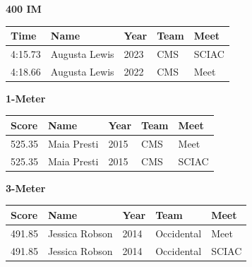 \vspace{1.2em}
\noindent\begin{minipage}[t]{0.98\textwidth}
\centering
\textbf{\textcolor{teamprimary}{400 IM}}\par
\vspace{0.5em}
\centering
\small
\renewcommand{\arraystretch}{1.0}
\setlength{\tabcolsep}{4pt}
\begin{tabular}{@{}p{2.5cm}p{4.5cm}p{1.5cm}p{2.5cm}p{2.5cm}@{}}
\toprule
\textbf{Time} & \textbf{Name} & \textbf{Year} & \textbf{Team} & \textbf{Meet} \\
\midrule
4:15.73 & Augusta Lewis & 2023 & CMS & SCIAC \\
4:18.66 & Augusta Lewis & 2022 & CMS & Meet \\
\bottomrule
\end{tabular}
\end{minipage}
\vspace{1.2em}
\noindent\begin{minipage}[t]{0.98\textwidth}
\centering
\textbf{\textcolor{teamprimary}{1-Meter}}\par
\vspace{0.5em}
\centering
\small
\renewcommand{\arraystretch}{1.0}
\setlength{\tabcolsep}{4pt}
\begin{tabular}{@{}p{2.5cm}p{4.5cm}p{1.5cm}p{2.5cm}p{2.5cm}@{}}
\toprule
\textbf{Score} & \textbf{Name} & \textbf{Year} & \textbf{Team} & \textbf{Meet} \\
\midrule
525.35 & Maia Presti & 2015 & CMS & Meet \\
525.35 & Maia Presti & 2015 & CMS & SCIAC \\
\bottomrule
\end{tabular}
\end{minipage}
\vspace{1.2em}
\noindent\begin{minipage}[t]{0.98\textwidth}
\centering
\textbf{\textcolor{teamprimary}{3-Meter}}\par
\vspace{0.5em}
\centering
\small
\renewcommand{\arraystretch}{1.0}
\setlength{\tabcolsep}{4pt}
\begin{tabular}{@{}p{2.5cm}p{4.5cm}p{1.5cm}p{2.5cm}p{2.5cm}@{}}
\toprule
\textbf{Score} & \textbf{Name} & \textbf{Year} & \textbf{Team} & \textbf{Meet} \\
\midrule
491.85 & Jessica Robson & 2014 & Occidental & Meet \\
491.85 & Jessica Robson & 2014 & Occidental & SCIAC \\
\bottomrule
\end{tabular}
\end{minipage}
